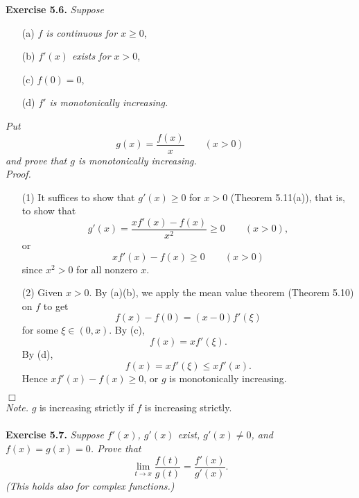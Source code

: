 \documentclass{article}
\begin{document}



\textbf{Exercise 5.6.}
\emph{Suppose}
\begin{enumerate}
  \item[(a)]
  \emph{$f$ is continuous for $x \geq 0$},

  \item[(b)]
  \emph{$f'(x)$ exists for $x > 0$},

  \item[(c)]
  \emph{$f(0) = 0$},

  \item[(d)]
  \emph{$f'$ is monotonically increasing.}
\end{enumerate}
\emph{Put
\[
  g(x) = \frac{f(x)}{x} \qquad (x>0)
\]
and prove that $g$ is monotonically increasing.} \\

\emph{Proof.}
\begin{enumerate}
  \item[(1)]
  It suffices to show that $g'(x) \geq 0$ for $x>0$ (Theorem 5.11(a)),
  that is, to show that
  \[
    g'(x) = \frac{x f'(x) - f(x)}{x^2} \geq 0 \qquad (x>0),
  \]
  or
  \[
    x f'(x) - f(x) \geq 0 \qquad (x>0)
  \]
  since $x^2 > 0$ for all nonzero $x$.

  \item[(2)]
  Given $x > 0$.
  By (a)(b), we apply the mean value theorem (Theorem 5.10) on $f$ to get
  \[
    f(x) - f(0) = (x - 0)f'(\xi)
  \]
  for some $\xi \in (0,x)$.
  By (c),
  \[
    f(x) = x f'(\xi).
  \]
  By (d),
  \[
    f(x) = x f'(\xi) \leq x f'(x).
  \]
  Hence $x f'(x) - f(x) \geq 0$,
  or $g$ is monotonically increasing.
\end{enumerate}
$\Box$ \\

\emph{Note.}
$g$ is increasing strictly if $f$ is increasing strictly. \\\\






\textbf{Exercise 5.7.}
\emph{Suppose $f'(x)$, $g'(x)$ exist, $g'(x) \neq 0$, and $f(x) = g(x) = 0$.
Prove that
\[
  \lim_{t \to x}{\frac{f(t)}{g(t)}} = \frac{f'(x)}{g'(x)}.
\]
(This holds also for complex functions.)} \\
\end{document}
